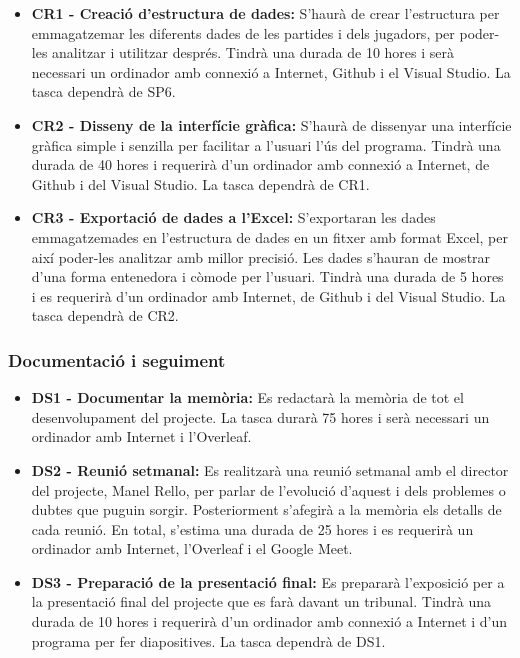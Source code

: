 \documentclass[a4paper]{article}
\begin{document}
\begin{itemize}
    \item \textbf{CR1 - Creació d'estructura de dades:} S'haurà de crear l'estructura per emmagatzemar les diferents dades de les partides i dels jugadors, per poder-les analitzar i utilitzar després. Tindrà una durada de 10 hores i serà necessari un ordinador amb connexió a Internet, Github i el Visual Studio. La tasca dependrà de SP6.
    \item \textbf{CR2 - Disseny de la interfície gràfica:} S'haurà de dissenyar una interfície gràfica simple i senzilla per facilitar a l'usuari l'ús del programa. Tindrà una durada de 40 hores i requerirà d'un ordinador amb connexió a Internet, de Github i del Visual Studio. La tasca dependrà de CR1. 
    \item \textbf{CR3 - Exportació de dades a l'Excel:} S'exportaran les dades emmagatzemades en l'estructura de dades en un fitxer amb format Excel, per així poder-les analitzar amb millor precisió. Les dades s'hauran de mostrar d'una forma entenedora i còmode per l'usuari. Tindrà una durada de 5 hores i es requerirà d'un ordinador amb Internet, de Github i del Visual Studio. La tasca dependrà de CR2.
\end{itemize}

\subsubsection{Documentació i seguiment}
\begin{itemize}
    \item \textbf{DS1 - Documentar la memòria:} Es redactarà la memòria de tot el desenvolupament del projecte. La tasca durarà 75 hores i serà necessari un ordinador amb Internet i l'Overleaf.
    \item \textbf{DS2 - Reunió setmanal:} Es realitzarà una reunió setmanal amb el director del projecte, Manel Rello, per parlar de l'evolució d'aquest i dels problemes o dubtes que puguin sorgir. Posteriorment s'afegirà a la memòria els detalls de cada reunió. En total, s'estima una durada de 25 hores i es requerirà un ordinador amb Internet, l'Overleaf i el Google Meet.
    \item \textbf{DS3 - Preparació de la presentació final:} Es prepararà l'exposició per a la presentació final del projecte que es farà davant un tribunal. Tindrà una durada de 10 hores i requerirà d'un ordinador amb connexió a Internet i d'un programa per fer diapositives. La tasca dependrà de DS1. 
\end{itemize}
\end{document}
